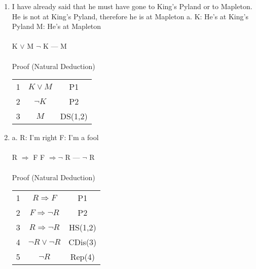 \documentclass[]{article}
\begin{document}
\begin{enumerate}
    \item  I have already said that he must have gone to King’s Pyland or to Mapleton. He is not at King’s Pyland, therefore he is at Mapleton
    \newline a.
    \newline K: He's at King's Pyland
    \newline M: He's at Mapleton
    \\\\ K $\lor$ M
    \newline $\neg$ K
    \newline ---
    \newline M
    \\\\ Proof (Natural Deduction)
    \begin{tabular}{c| c | c}
        1 & $K \lor M$ & P1 \\
        2 & $\neg K$ & P2 \\
        3 & $M$ & DS(1,2) \\
    \end{tabular}
    
    \item a.
    \newline R: I'm right
    \newline F: I'm a fool
    \\\\ R $\Rightarrow$ F
    \newline F $\Rightarrow \neg$ R
    \newline ---
    \newline $\neg$ R
    \\\\ Proof (Natural Deduction)
    \begin{tabular}{c| c | c}
        1 & $R \Rightarrow F$ & P1 \\
        2 & $F \Rightarrow \neg R$ & P2 \\
        3 & $R \Rightarrow \neg R$ & HS(1,2) \\
        4 & $\neg R \lor \neg R$ & CDis(3) \\
        5 & $\neg R$ & Rep(4) \\
    \end{tabular}
    

\end{enumerate}
\end{document}
